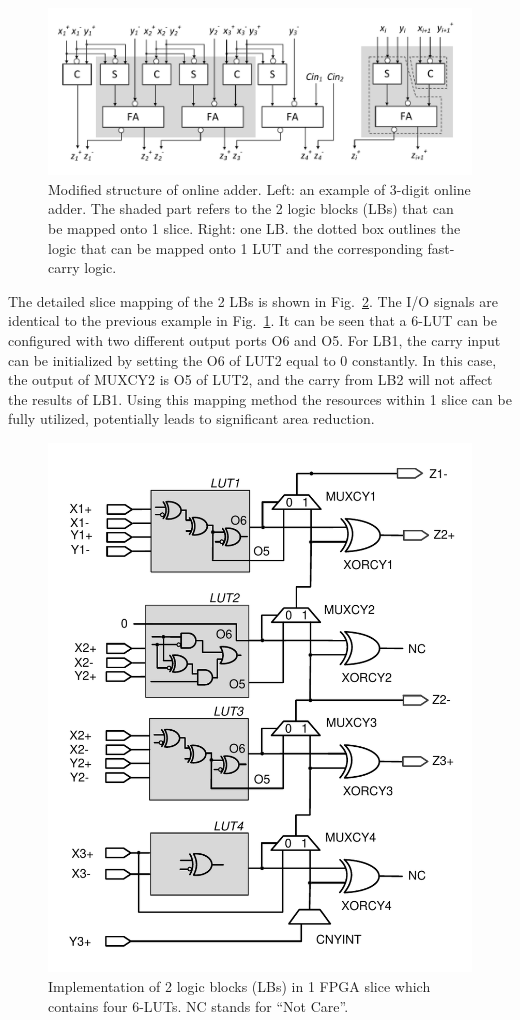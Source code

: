 \documentclass[conference]{IEEEtran}
\begin{document}
\begin{figure}[tbp]
	\centering
	\includegraphics[width=.5\textwidth]{./Figures/SDadder_FPGA_New.pdf}
	\caption{Modified structure of online adder. Left: an example of 3-digit online adder. The shaded part refers to the 2 logic blocks (LBs) that can be mapped onto 1 slice. Right: one LB. the dotted box outlines the logic that can be mapped onto 1 LUT and the corresponding fast-carry logic.}
	\label{Fig:ModifiedOA}
\end{figure}

The detailed slice mapping of the 2 LBs is shown in Fig.~\ref{Fig:SliceNew}. The I/O signals are identical to the previous example in Fig.~\ref{Fig:ModifiedOA}. It can be seen that a 6-LUT can be configured with two different output ports O6 and O5. For LB1, the carry input can be initialized by setting the O6 of LUT2 equal to 0 constantly. In this case, the output of MUXCY2 is O5 of LUT2, and the carry from LB2 will not affect the results of LB1. Using this mapping method the resources within 1 slice can be fully utilized, potentially leads to significant area reduction. 

\begin{figure}[tbp]
	\centering
	\includegraphics[width=.5\textwidth]{./Figures/SDadder_FastCarry_New.pdf}
	\caption{Implementation of 2 logic blocks (LBs) in 1 FPGA slice which contains four 6-LUTs. NC stands for ``Not Care''.}
	\label{Fig:SliceNew}
\end{figure}
\end{document}
